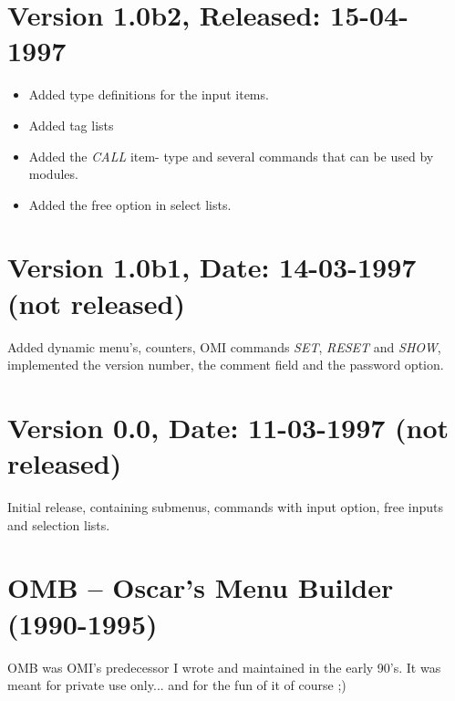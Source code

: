 \documentclass[a4paper]{book}
\begin{document}
\section*{Version 1.0b2, Released: 15-04-1997}

\begin{itemize}
\item Added type definitions for the input items.
\item Added tag lists
\item Added the \textsl{CALL} item- type and several commands that can be used by modules.
\item Added the free option in select lists.
\end{itemize}

\section*{Version 1.0b1, Date: 14-03-1997  (not released)}

Added dynamic menu's, counters, OMI commands \textsl{SET}, \textsl{RESET} and \textsl{SHOW}, implemented the version number, the comment field and the password option.

\section*{Version 0.0, Date: 11-03-1997  (not released)}

Initial release, containing submenus, commands with input option, free inputs and selection lists.

\section*{OMB -- Oscar's Menu Builder (1990-1995)}

OMB was OMI's predecessor I wrote and maintained in the early 90's. It was meant for private use only... and for the fun of it of course ;)

\newpage
{}
\printindex
\end{document}
